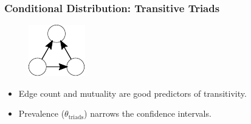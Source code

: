 \documentclass[aspectratio=169, 9pt]{beamer}
\begin{document}
\begin{frame}[t,label=conditional-transitivity]
	\frametitle{Conditional Distribution: Transitive Triads}

\begin{minipage}[t]{.75\linewidth}
\begin{figure}
	\centering
	\hspace{-1.1cm}
	\def\svgwidth{1.05\linewidth}
\end{figure}
\end{minipage}\hfill
\begin{minipage}[t]{.23\linewidth}
	\small
	\begin{figure}
		\includegraphics[width=.3\linewidth]{ttriad.pdf}
	\end{figure}
	\begin{itemize}
		\item<7-> Edge count and mutuality are good predictors of transitivity.
		\item<8-> Prevalence ($\theta_{\mbox{triads}}$) narrows the confidence intervals.
	\end{itemize}
\end{minipage}

\vfill\hfill
\hyperlink{conditional-mutual}{}
\end{frame}
\end{document}

